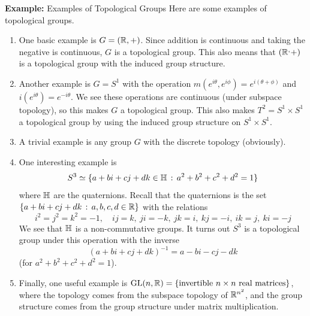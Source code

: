 \begin{example}{\textbf{Example:} Examples of Topological Groups}
    Here are some examples of topological groups. 
    \begin{enumerate}
        \item One basic example is $G = (\mathbb{R}, +)$. Since addition is continuous and taking the negative is continuous, $G$ is a topological group. This also means that $(\mathbb{R}^, +)$ is a topological group with the induced group structure. 
        \item Another example is $G = S^1$ with the operation $m(e^{i\theta}, e^{i\phi}) = e^{i(\theta + \phi)}$ and $i(e^{i\theta}) = e^{-i\theta}$. We see these operations are continuous (under subspace topology), so this makes $G$ a topological group. This also makes $T^2 = S^1 \times S^1$ a topological group by using the induced group structure on $S^1 \times S^1$.
        \item A trivial example is any group $G$ with the discrete topology (obviously).
        \item One interesting example is 
        \[ S^3 \simeq \{a + bi + cj + dk \in \mathbb{H} \, :\, a^2 + b^2 + c^2 + d^2 = 1\} \]
        where $\mathbb{H}$ are the quaternions. Recall that the quaternions is the set $\{a + bi + cj + dk \, :\, a, b, c, d \in \mathbb{R}\}$ with the relations
        \[ i^2 = j^2 = k^2 = -1, \quad ij = k,\ ji = -k,\ jk = i,\ kj = -i,\ ik = j,\ ki = -j \]
        We see that $\mathbb{H}$ is a non-commutative groups. It turns out $S^3$ is a topological group under this operation with the inverse
        \[ (a + bi + cj + dk)^{-1} = a - bi - cj - dk \]
        (for $a^2 + b^2 + c^2 + d^2 = 1$).
        \item Finally, one useful example is $\text{GL}(n, \mathbb{R}) = \{\text{invertible } n \times n \text{ real matrices}\}$, where the topology comes from the subspace topology of $\mathbb{R}^{n^2}$, and the group structure comes from the group structure under matrix multiplication.
    \end{enumerate}
 
\end{example}

 